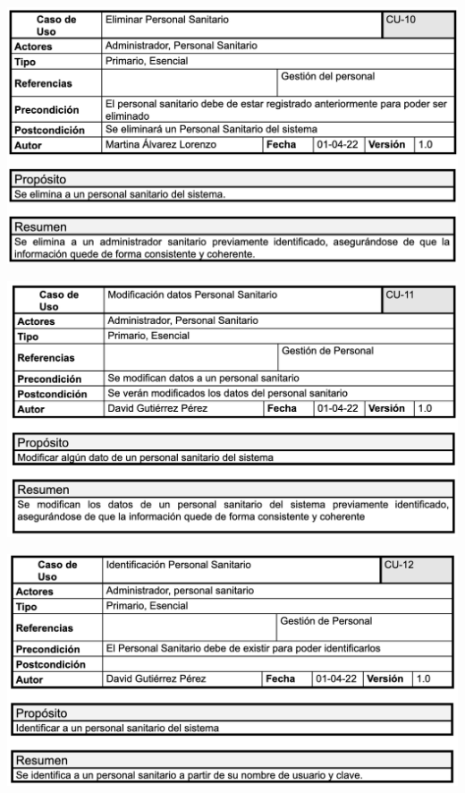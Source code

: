 \documentclass[12pt, spanish]{article}
\begin{document}
\begin{centering}\includegraphics[scale = 0.70]{casos_de_uso/10.png}\\[1.0 cm]\end{centering}
\begin{centering}\includegraphics[scale = 0.70]{casos_de_uso/11.png}\\[1.0 cm]\end{centering}
\begin{centering}\includegraphics[scale = 0.70]{casos_de_uso/12.png}\\[1.0 cm]\end{centering}
\end{document}
